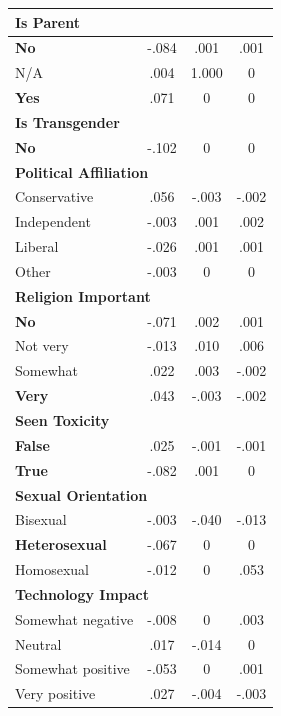 \documentclass[11pt]{article}
\theoremstyle{definition}
\theoremstyle{plain}
\begin{document}
\begin{table}[t]
\begin{tabular}{l c c c}
		\multicolumn{4}{l}{\textbf{Is Parent}} \\
		\midrule
		\textbf{No} & -.084 & .001 & .001 \\
		N/A & .004 & 1.000 & 0 \\
		\textbf{Yes} & .071 & 0 & 0 \\
		\midrule
		
		\multicolumn{4}{l}{\textbf{Is Transgender}} \\
		\midrule
		\textbf{No} & -.102 & 0 & 0 \\
		\midrule
		
		\multicolumn{4}{l}{\textbf{Political Affiliation}} \\
		\midrule
		Conservative & .056 & -.003 & -.002 \\
		Independent & -.003 & .001 & .002 \\
		Liberal & -.026 & .001 & .001 \\
		Other & -.003 & 0 & 0 \\
		\midrule
		
		\multicolumn{4}{l}{\textbf{Religion Important}} \\
		\midrule
		\textbf{No} & -.071 & .002 & .001 \\
		Not very & -.013 & .010 & .006 \\
		Somewhat & .022 & .003 & -.002 \\
		\textbf{Very} & .043 & -.003 & -.002 \\
		\midrule
		
		\multicolumn{4}{l}{\textbf{Seen Toxicity}} \\
		\midrule
		\textbf{False} & .025 & -.001 & -.001 \\
		\textbf{True} & -.082 & .001 & 0 \\
		\midrule
		
		\multicolumn{4}{l}{\textbf{Sexual Orientation}} \\
		\midrule
		Bisexual & -.003 & -.040 & -.013 \\
		\textbf{Heterosexual} & -.067 & 0 & 0 \\
		Homosexual & -.012 & 0 & .053 \\
		\midrule
		
		\multicolumn{4}{l}{\textbf{Technology Impact}} \\
		\midrule
		Somewhat negative & -.008 & 0 & .003 \\
		Neutral & .017 & -.014 & 0 \\
		Somewhat positive & -.053 & 0 & .001 \\
		Very positive & .027 & -.004 & -.003 \\
		\midrule
		

\end{tabular}
\end{table}
\end{document}
